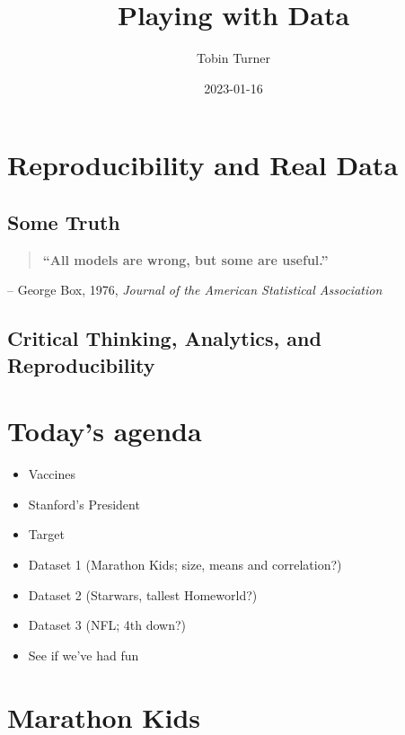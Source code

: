 \documentclass[
]{book}
\title{Playing with Data}
\author{Tobin Turner}
\date{2023-01-16}
\providecommand{\tightlist}{%
  \setlength{\itemsep}{0pt}\setlength{\parskip}{0pt}}
\begin{document}
\maketitle

{
\setcounter{tocdepth}{1}
\tableofcontents
}
\hypertarget{reproducibility-and-real-data}{%
\chapter{Reproducibility and Real Data}\label{reproducibility-and-real-data}}

\hypertarget{some-truth}{%
\section{Some Truth}\label{some-truth}}

\begin{quote}
\textbf{``All models are wrong, but some are useful.''}
\end{quote}

-- George Box, 1976, \emph{Journal of the American Statistical Association}

\hypertarget{critical-thinking-analytics-and-reproducibility}{%
\section{Critical Thinking, Analytics, and Reproducibility}\label{critical-thinking-analytics-and-reproducibility}}

\hypertarget{todays-agenda}{%
\chapter{Today's agenda}\label{todays-agenda}}

\begin{itemize}
\tightlist
\item
  Vaccines
\item
  Stanford's President
\item
  Target
\item
  Dataset 1 (Marathon Kids; size, means and correlation?)
\item
  Dataset 2 (Starwars, tallest Homeworld?)
\item
  Dataset 3 (NFL; 4th down?)
\item
  See if we've had fun
\end{itemize}

\hypertarget{marathon-kids}{%
\chapter{Marathon Kids}\label{marathon-kids}}
\end{document}
